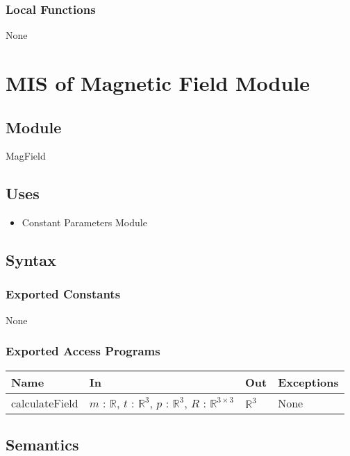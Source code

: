 \documentclass[12pt, titlepage]{article}
\begin{document}
\subsubsection{Local Functions}
None

\newpage

\section{MIS of Magnetic Field Module} \label{MISMagField}
\subsection{Module}
MagField

\subsection{Uses}
\begin{itemize}
  \item Constant Parameters Module
\end{itemize}

\subsection{Syntax}

\subsubsection{Exported Constants}
None

\subsubsection{Exported Access Programs}
\begin{center}
\begin{tabular}{p{3cm} p{4cm} p{4cm} p{3cm}}
\hline
\textbf{Name} & \textbf{In} & \textbf{Out} & \textbf{Exceptions} \\
\hline
calculateField & $m$ : $\mathbb{R}$, $t$ : $\mathbb{R}^3$, $p$ : $\mathbb{R}^3$, $R$ : $\mathbb{R}^{3 \times 3}$ & $\mathbb{R}^3$ & None \\
\hline
\end{tabular}
\end{center}

\subsection{Semantics}
\end{document}
